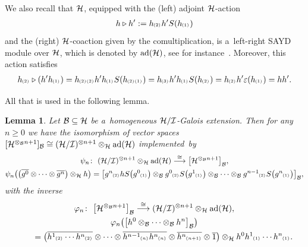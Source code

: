 \documentclass[pdftex]{sigma}
\numberwithin{equation}{section}
\newtheorem{Lemma}[Theorem]{Lemma}
{ \theoremstyle{definition}
\newtheorem{Remark}[Theorem]{Remark} }
\DeclareMathOperator{\ad}{ad}
\newcommand{\ps}[1]{~\hspace{-4pt}_{^{(#1)}}}
\newcommand{\wbar}[1]{\overline{#1}}
\begin{document}
We also recall that ${\cal H}$, equipped with the (left) adjoint ${\cal H}$-action
\begin{gather}
\label{HonM}
h\triangleright h':=h\ps{2}h'S(h\ps{1})
\end{gather}
and the (right) ${\cal H}$-coaction given by the comultiplication, is a~left-right SAYD module over ${\cal H}$, which is
denoted by $\ad({\cal H})$, see for instance~\cite[Example~4.3]{JaraStef06}.
Moreover, this action satisf\/ies
\begin{gather}
\label{HonH}
h\ps{2}\triangleright (h'h\ps{1}) =h\ps{2}\ps{2}h'h\ps{1}S(h\ps{2}\ps{1})
=h\ps{3}h'h\ps{1}S(h\ps{2}) =h\ps{2}h'\varepsilon(h\ps{1}) =hh'.
\end{gather}

All that is used in the following lemma.

\begin{Lemma}
Let ${\cal B}\subseteq {\cal H}$ be a~homogeneous ${\cal H}/{\cal I}$-Galois extension.
Then for any $n \geq 0$ we have the isomorphism of vector spaces $[{\cal H}^{\otimes_{\cal B} n+1}]_{{\cal
B}} \cong ({\cal H}/{\cal I})^{\otimes n+1} \otimes_{\cal H} \ad({\cal H})$ implemented~by
\begin{gather}
\psi_n\colon \  ({\cal H}/{\cal I})^{\otimes n+1} \otimes_{\cal H} \ad({\cal H})\stackrel{\cong}{\longrightarrow}
\big[{\cal H}^{\otimes_{\cal B} n+1}\big]_{\cal B},
\label{aux-map-psi}
\\
\psi_n\big(\big(\wbar{g^0}\otimes\cdots\otimes \wbar{g^n}\big)\otimes_{\cal H} h \big)
=\big[g^n\ps{2}hS\big(g^0\ps{1}\big) \otimes_{\cal B} g^0\ps{2}S\big(g^1\ps{1}\big) \otimes_{\cal B} \cdots \otimes_{\cal B}g^{n-1}\ps{2}S\big(g^n\ps{1}\big)\big]_{\cal B},
\nonumber
\end{gather}
with the inverse
\begin{gather}
\varphi_n\colon \ \big[{\cal H}^{\otimes_{\cal B} n+1}\big]_{{\cal B}} \stackrel{\cong}{\longrightarrow} ({\cal H}/{\cal
I})^{\otimes n+1} \otimes_{\cal H} \ad({\cal H}),
\nonumber
\\
\varphi_n\big(\big[h^0\otimes_{\cal B}\cdots\otimes_{\cal B} h^n\big]_{\cal B} \big)\nonumber\\
\qquad{}
=\big(\wbar{h^1\ps{2}\cdots h^n\ps{2}} \otimes\cdots\otimes \wbar{h^{n-1}\ps{n}h^n\ps{n}}
\otimes
\wbar{h^n\ps{n+1}} \otimes \wbar{1}\big) \otimes_{\cal H} h^0h^1\ps{1}\cdots h^n\ps{1}.
\label{aux-map-vp}
\end{gather}
\end{Lemma}
\end{document}
